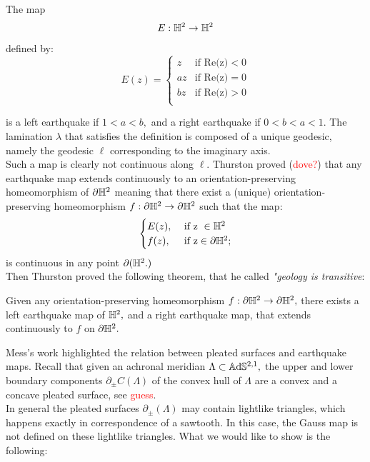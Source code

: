 \begin{example}
The map 
\[
    E:\mathbb{H}^2\to\mathbb{H}^2
\]

defined by:
\[
  E(z)= \begin{cases}
    z & \text{if Re(z)}<0 \\
    az & \text{if Re(z)}=0 \\
    bz & \text{if Re(z)}>0 \\    
\end{cases}
\]

is a left earthquake if $1<a<b,$ and a right earthquake if $0<b<a<1$. The lamination $\lambda$ that satisfies the definition is composed of a unique geodesic, namely the geodesic $\ell$ corresponding to the imaginary axis. \\
Such a map is clearly not continuous along $\ell$.
Thurston proved (\textcolor{red}{dove?}) that any earthquake map extends continuously to an orientation-preserving homeomorphism of $\partial\mathbb{H}^2$ meaning that there exist a (unique) orientation-preserving homeomorphism $f:\partial\mathbb{H}^2\to\partial\mathbb{H}^2$ such that the map: 
\[
    \begin{cases}
        E(z), &\text{ if z }\in \mathbb{H}^2\\
        f(z), &\text{ if z}\in \partial\mathbb{H}^2  ;\\
        
    \end{cases}
\]
is continuous in any point $\partial(\mathbb{H}^2.)$\\
Then Thurston proved the following theorem, that he called \textit{"geology is transitive}:

\begin{theorem}
    Given any orientation-preserving homeomorphism $f:\partial\mathbb{H}^2\to\partial\mathbb{H}^2,$ there exists a left earthquake map of $\mathbb{H}^2,$ and a right earthquake map, that extends continuously to $f$ on $\partial\mathbb{H}^2.$
\end{theorem}
\end{example}

Mess's work \cite{Mess} highlighted the relation between pleated surfaces and earthquake maps. Recall that given an achronal meridian $\Lambda\subset\mathbb{A}\mathrm{d}\mathbb{S}^{2,1},$ the upper and lower boundary components $\partial_{\pm}C(\Lambda)$ of the convex hull of $\Lambda$ are a convex and a concave pleated surface, see \textcolor{red}{guess}.\\
In general the pleated surfaces $\partial_\pm(\Lambda)$ may contain lightlike triangles, which happens exactly in correspondence of a sawtooth. In this case, the Gauss map is not defined on these lightlike triangles. What we would like to show is the following: 

